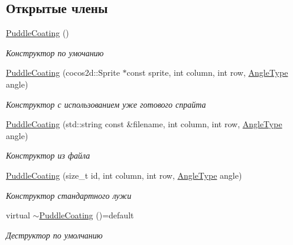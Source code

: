\subsection*{Открытые члены}
\begin{DoxyCompactItemize}
\item 
\mbox{\label{classrtm_1_1_puddle_coating_adc8ec09ad8833bf8ae77a77ce37a7945}} 
\hyperlink{classrtm_1_1_puddle_coating_adc8ec09ad8833bf8ae77a77ce37a7945}{Puddle\+Coating} ()
\begin{DoxyCompactList}\small\item\em Конструктор по умочанию \end{DoxyCompactList}\item 
\hyperlink{classrtm_1_1_puddle_coating_a7624921639d25bb1061d0344790375b4}{Puddle\+Coating} (cocos2d\+::\+Sprite $\ast$const sprite, int column, int row, \hyperlink{namespacertm_a69dc82b16a0148c10962caa83d930f89}{Angle\+Type} angle)
\begin{DoxyCompactList}\small\item\em Конструктор с использованием уже готового спрайта \end{DoxyCompactList}\item 
\hyperlink{classrtm_1_1_puddle_coating_a82e0dcae5a891240e2d89cd84f672cb8}{Puddle\+Coating} (std\+::string const \&filename, int column, int row, \hyperlink{namespacertm_a69dc82b16a0148c10962caa83d930f89}{Angle\+Type} angle)
\begin{DoxyCompactList}\small\item\em Конструктор из файла \end{DoxyCompactList}\item 
\hyperlink{classrtm_1_1_puddle_coating_a3e0e44711ab312c092fc3cf130984b15}{Puddle\+Coating} (size\+\_\+t id, int column, int row, \hyperlink{namespacertm_a69dc82b16a0148c10962caa83d930f89}{Angle\+Type} angle)
\begin{DoxyCompactList}\small\item\em Конструктор стандартного лужи \end{DoxyCompactList}\item 
\mbox{\label{classrtm_1_1_puddle_coating_a14d812f0ffd6f7eea21abdb1b3fcb9ef}} 
virtual \hyperlink{classrtm_1_1_puddle_coating_a14d812f0ffd6f7eea21abdb1b3fcb9ef}{$\sim$\+Puddle\+Coating} ()=default
\begin{DoxyCompactList}\small\item\em Деструктор по умолчанию \end{DoxyCompactList}\end{DoxyCompactItemize}
